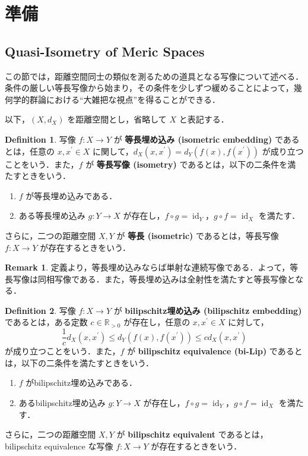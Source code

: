 \documentclass[dvipdfmx]{ujarticle}
\DeclareMathOperator{\id}{id}
\theoremstyle{definition}
\newtheorem{dfn}{Definition}[section]
\newtheorem*{rem*}{Remark}
\begin{document}
\section{準備}\label{sec_jyunbi}
\subsection{Quasi-Isometry of Meric Spaces}\label{subsec_QI_of_Metric}
この節では，距離空間同士の類似を測るための道具となる写像について述べる．条件の厳しい等長写像から始まり，その条件を少しずつ緩めることによって，幾何学的群論における``大雑把な視点''を得ることができる．

以下，$(X,d_X)$ を距離空間とし，省略して $X$ と表記する．
\begin{dfn}\label{isom}
写像 $f\colon X\rightarrow Y$ が \textbf{等長埋め込み (isometric embedding)} であるとは，任意の $x,x^\prime\in X$ に関して，$d_X(x,x^\prime)=d_Y(f(x),f(x^\prime))$ が成り立つことをいう．また，$f$ が \textbf{等長写像 (isometry)} であるとは，以下の二条件を満たすときをいう．
\begin{enumerate}
  \item $f$ が等長埋め込みである．
  \item ある等長埋め込み $g\colon Y\rightarrow X$ が存在し，$f\circ g=\id_Y，g\circ f=\id_X$ を満たす．
\end{enumerate}
さらに，二つの距離空間 $X,Y$ が \textbf{等長 (isometric)} であるとは，等長写像 $f\colon X\rightarrow Y$ が存在するときをいう． 
\end{dfn}

\begin{rem*}
 定義より，等長埋め込みならば単射な連続写像である．よって，等長写像は同相写像である．また，等長埋め込みは全射性を満たすと等長写像となる．
\end{rem*}

\begin{dfn}\label{bi-Lip}
写像 $f\colon X\rightarrow Y$ が \textbf{bilipschitz埋め込み (bilipschitz embedding)} であるとは，ある定数 $c\in\mathbb{R}_{>0}$ が存在し，任意の $x,x^\prime\in X$ に対して，
 $$\frac{1}{c}d_X(x,x^\prime)\leq d_Y(f(x),f(x^\prime))\leq cd_X(x,x^\prime)$$
 が成り立つことをいう．また，$f$ が \textbf{bilipschitz equivalence (bi-Lip)} であるとは，以下の二条件を満たすときをいう．
 \begin{enumerate}
   \item $f$ がbilipschitz埋め込みである．
   \item あるbilipschitz埋め込み $g\colon Y\rightarrow X$ が存在し，$f\circ g=\id_Y$，$g\circ f=\id_X$ を満たす．
 \end{enumerate}
さらに，二つの距離空間 $X,Y$ が \textbf{bilipschitz equivalent} であるとは，bilipschitz equivalence な写像 $f\colon X\rightarrow Y$ が存在するときをいう． 
\end{dfn}
\end{document}
